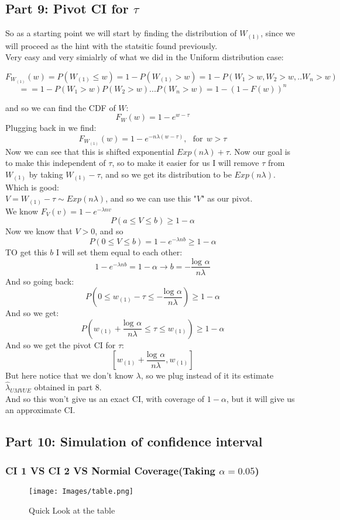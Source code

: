 \documentclass[12pt]{article}
\begin{document}
\subsection*{Part 9: Pivot CI for $\tau$}
So as a starting point we will start by finding the distribution of $W_{(1)}$, since we will proceed as the hint with the statsitic found previously. \\ 
Very easy and very simialrly of what we did in the Uniform distribution case: 

\[
F_{W_{(1)}}(w) = P(W_{(1)} \leq w) = 1 - P(W_{(1)} > w) = 1 - P(W_1 > w, W_2 > w,..W_n > w) 
\]
\[
 = = 1 - P(W_1 > w)P(W_2 > w)...P(W_n > w) = 1 - (1-F(w))^n
\]

and so we can find the CDF of $W$: 
\[
F_W(w) = 1-e^{w-\tau}
\]
Plugging back in we find: 
\[
F_{W_{(1)}}(w) = 1 - e^{-n\lambda(w-\tau)}, \ \ \ \text{for} \ \ w>\tau
\]
Now we can see that this is shifted exponential $Exp(n\lambda) + \tau$. 
Now our goal is to make this independent of $\tau$, so to make it easier for us I will remove $\tau$ from $W_{(1)}$ by taking $W_{(1)} - \tau$, and so we get its distribution to be $Exp(n\lambda)$. Which is good: \\
$V = W_{(1)} - \tau \sim Exp(n\lambda)$, and so we can use this "$V$" as our pivot.\\ 
We know $F_V(v) = 1-e^{-\lambda n v}$ 
\[
P(a \leq V \leq b) \geq 1 - \alpha
\]
Now we know that $V>0$, and so 
\[
P(0 \leq V \leq b) = 1 - e^{-\lambda n b} \geq 1 - \alpha
\]
TO get this $b$ I will set them equal to each other:
\[
1 - e^{-\lambda n b} = 1 - \alpha \rightarrow b= -\frac{\text{log } \alpha}{n\lambda}
\] 
And so going back: 
\[
P(0 \leq w_{(1)} - \tau \leq -\frac{\text{log } \alpha}{n\lambda}) \geq 1 - \alpha
\]
And so we get:
\[  
P \left(w_{(1)} + \frac{\text{log } \alpha}{n\lambda} \leq \tau \leq w_{(1)} \right) \geq 1 - \alpha
\]
And so we get the pivot CI for $\tau$:
\[
\left[w_{(1)} + \frac{\text{log } \alpha}{n\lambda}, w_{(1)} \right]
\]
But here notice that we don't know $\lambda$, so we plug instead of it its estimate $\hat{\lambda}_{UMVUE}$ obtained in part 8.\\ And so this won't give us an exact CI, with coverage of $1-\alpha$, but it will give us an approximate CI.
\subsection*{Part 10: Simulation of confidence interval}
\subsubsection*{CI 1 VS CI 2 VS Normial Coverage(Taking $\alpha = 0.05$)}
\begin{figure}[H]
\centering
\texttt{[image: Images/table.png]}
\caption{Quick Look at the table}
\end{figure}
\end{document}
